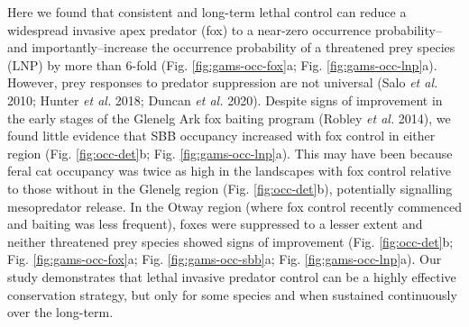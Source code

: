 \documentclass[]{elsarticle} %
\begin{document}
Here we found that consistent and long-term lethal control can reduce a widespread invasive apex predator (fox) to a near-zero occurrence probability--and importantly--increase the occurrence probability of a threatened prey species (LNP) by more than 6-fold (Fig. \ref{fig:gams-occ-fox}a; Fig. \ref{fig:gams-occ-lnp}a). However, prey responses to predator suppression are not universal (Salo \emph{et al.} 2010; Hunter \emph{et al.} 2018; Duncan \emph{et al.} 2020). Despite signs of improvement in the early stages of the Glenelg Ark fox baiting program (Robley \emph{et al.} 2014), we found little evidence that SBB occupancy increased with fox control in either region (Fig. \ref{fig:occ-det}b; Fig. \ref{fig:gams-occ-lnp}a). This may have been because feral cat occupancy was twice as high in the landscapes with fox control relative to those without in the Glenelg region (Fig. \ref{fig:occ-det}b), potentially signalling mesopredator release. In the Otway region (where fox control recently commenced and baiting was less frequent), foxes were suppressed to a lesser extent and neither threatened prey species showed signs of improvement (Fig. \ref{fig:occ-det}b; Fig. \ref{fig:gams-occ-fox}a; Fig. \ref{fig:gams-occ-sbb}a; Fig. \ref{fig:gams-occ-lnp}a). Our study demonstrates that lethal invasive predator control can be a highly effective conservation strategy, but only for some species and when sustained continuously over the long-term.
\end{document}
